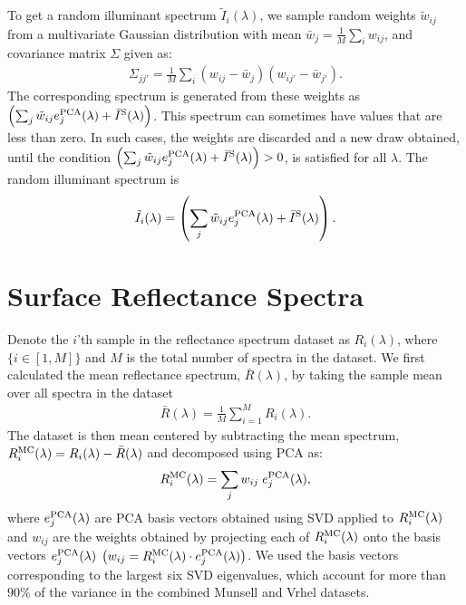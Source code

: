 \documentclass[10pt,english]{article}
\begin{document}
To get a random illuminant spectrum $\tilde{I}_i(\lambda)$, we sample random weights $\tilde{w}_{ij}$ from  
a multivariate Gaussian distribution with mean $\bar{w}_j = \frac{1}{M}\sum_i w_{ij}$, 
and covariance matrix $\Sigma$ given as:
\begin{align}
\Sigma_{jj'} = \frac{1}{M} \sum_i \left(w_{ij} -\bar{w}_j\right)\left(w_{ij'} -\bar{w}_{j'}\right).
\end{align}
The corresponding spectrum is generated from these weights as $\left( \sum_j \tilde{w}_{ij} e_j^{\rm PCA}(\lambda) +  \bar{I}^{\rm S} (\lambda)\right)$.
This spectrum can sometimes have values that are less than zero. 
In such cases, the weights are discarded and a new draw obtained, until
the condition $\left( \sum_j \tilde{w}_{ij} e_j^{\rm PCA}(\lambda)+  \bar{I}^{\rm S} (\lambda)\right) > 0$, is satisfied for all $\lambda$.
The random illuminant spectrum is
\begin{align}
\tilde{I}_i(\lambda) = \left( \sum_j \tilde{w}_{ij} e_j^{\rm PCA}(\lambda) +  \bar{I}^{\rm S} (\lambda)\right).
\end{align}

\section{Surface Reflectance Spectra}
Denote the $i$'th sample in the reflectance spectrum dataset as $R_i(\lambda)$, where $\{i \in [1,M]\}$ 
and $M$ is the total number of spectra in the dataset. 
We first calculated the mean reflectance spectrum,
$\bar{R}(\lambda)$, by taking the sample mean over all spectra in the dataset
\begin{align}
\bar{R}(\lambda) = \frac{1}{M} \sum_{i=1}^M R_i(\lambda).\end{align} 
The dataset is then mean centered by subtracting the mean spectrum, $R_i^{\rm MC}(\lambda) =  R_i(\lambda)-\bar{R}(\lambda)$ 
and decomposed using PCA as:
\begin{align}
R_i^{\rm MC}(\lambda) = \sum_j{w_{ij} \; e_j^{\rm PCA}(\lambda)},
\end{align} 
where $e_j^{\rm PCA}(\lambda)$ are PCA basis vectors obtained using SVD applied to $R_i^{\rm MC}(\lambda)$
and $w_{ij}$ are the weights obtained by projecting each of $R_i^{\rm MC}(\lambda)$ onto the basis vectors $e_j^{\rm PCA}(\lambda)$ 
$\left( w_{ij} = R_i^{\rm MC}(\lambda)\cdot e_j^{\rm PCA}(\lambda)\right)$. 
We used the basis vectors corresponding to the largest six SVD eigenvalues, which account for
more than $90\%$ of the variance in the combined Munsell and Vrhel datasets.
\end{document}
